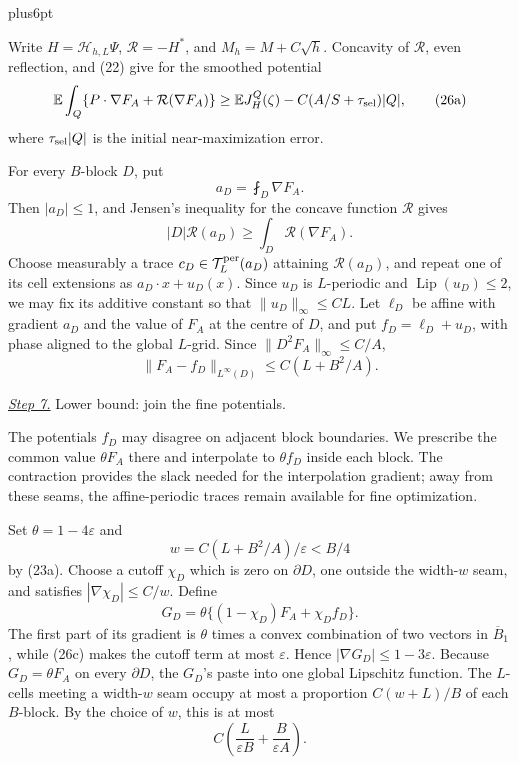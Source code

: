 \documentclass[11pt,reqno]{amsart}
\makeatletter
\theoremstyle{plain}
\theoremstyle{definition}
\theoremstyle{remark}
\renewenvironment{proof}[1][\proofname]{%
  \par
  \pushQED{\qed}%
  \normalfont
  \topsep6pt plus6pt\relax
  \trivlist
  \item[\hskip\labelsep\slshape #1\@addpunct{.}]%
  \ignorespaces
}{%
  \popQED
  \endtrivlist
  \@endpefalse
}
\DeclareRobustCommand{\qed}{%
  \leavevmode\unskip\penalty9999\hbox{}\nobreak
  \ifmmode
    \makebox[0pt][l]{\qquad\hbox{\qedsymbol}}%
  \else
    \qquad\hbox{\qedsymbol}%
  \fi
}
\renewcommand{\qedsymbol}{\rule[.47pt]{4pt}{6pt}}
\numberwithin{equation}{section}
\newcommand{\1}{\mathbf 1}
\makeatother
\begin{document}
\begin{proof}
Write $H=\mathcal H_ {h,L}\Psi$, $\mathcal R=-H^*$, and
$M_ h=M+C\sqrt h$.  Concavity of $\mathcal R$, even reflection, and (22) give
for the smoothed potential
\begin{equation}
\mathbb E\int_ Q\{P\cdot\nabla F_ A+\mathcal R(\nabla F_ A)\}
\geq\mathbb EJ_ H^Q(\zeta)-C(A/S+\tau_{\rm sel})|Q|,
\tag{26a}
\end{equation}
where $\tau_{\rm sel}|Q|$ is the initial near-maximization error.

For every $B$-block $D$, put
\begin{equation*}
a_ D=\fint_ D\nabla F_ A.
\end{equation*}
Then $|a_ D|\leq1$, and Jensen's inequality for the concave function
$\mathcal R$ gives
\begin{equation}
|D|\mathcal R(a_ D)\geq\int_ D \mathcal R(\nabla F_ A).
\tag{26b}
\end{equation}
Choose measurably a trace $c_ D\in\mathcal T_ L^{\rm per}(a_ D)$
attaining $\mathcal R(a_ D)$, and repeat one of its cell extensions as
$a_ D\cdot x+u_ D(x)$.  Since $u_ D$ is $L$-periodic and
$\operatorname {Lip}(u_ D)\leq2$, we may fix its additive constant so
that $\|u_ D\|_ \infty\leq CL$.  Let $\ell_ D$ be affine with gradient
$a_ D$ and the value of $F_ A$ at the centre of $D$, and put
$f_ D=\ell_ D+u_ D$, with phase aligned to the global $L$-grid.
Since $\|D^2F_ A\|_ \infty\leq C/A$,
\begin{equation}
\|F_ A-f_ D\|_ {L^\infty(D)}\leq C(L+B^2/A).
\tag{26c}
\end{equation}

\smallskip\noindent
\underline{\textit{Step 7.}} Lower bound: join the fine potentials.

The potentials $f_D$ may disagree on adjacent block boundaries.
We prescribe the common value $\theta F_A$ there and interpolate to
$\theta f_D$ inside each block.  The contraction provides the slack
needed for the interpolation gradient; away from these seams, the
affine-periodic traces remain available for fine optimization.

Set $\theta=1-4\varepsilon$ and
\begin{equation*}
w=C(L+B^2/A)/\varepsilon<B/4
\end{equation*}
by (23a).  Choose a cutoff $\chi_ D$ which is zero on $\partial D$,
one outside the width-$w$ seam, and satisfies
$|\nabla\chi_ D|\leq C/w$.  Define
\begin{equation}
G_ D=\theta\{(1-\chi_ D)F_ A+\chi_ D f_ D\}.
\tag{26d}
\end{equation}
The first part of its gradient is $\theta$ times a convex combination
of two vectors in $\overline B_ 1$, while (26c) makes the cutoff term
at most $\varepsilon$.  Hence $|\nabla G_ D|\leq1-3\varepsilon$.
Because $G_ D=\theta F_ A$ on every $\partial D$, the $G_ D$'s paste
into one global Lipschitz function.  The $L$-cells meeting a width-$w$
seam occupy at most a proportion $C(w+L)/B$ of each $B$-block.  By the
choice of $w$, this is at most
\begin{equation}
C\left(\frac{L}{\varepsilon B}
+\frac{B}{\varepsilon A}\right).
\tag{26e}
\end{equation}


\end{proof}
\end{document}
